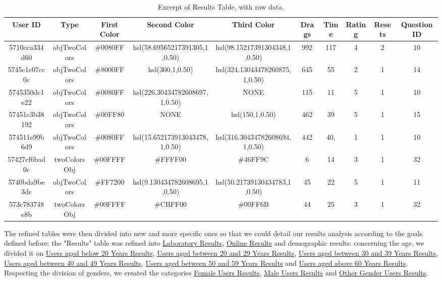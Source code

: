 \begin{table}[htbp]
  \resizebox{\textwidth}{!} {
  \begin{tabular} {|c|c|c|c|c|c|c|c|c|c|}
    \hline
    User ID & Type & First Color & Second Color & Third Color & Drags & Time & Rating & Resets & Question ID \\ \hline
    5710cca334d60 & objTwoColors & \#0080FF & hsl(58.69565217391305,1,0.50) & hsl(98.15217391304348,1,0.50) & 992 & 117 & 4 & 2 & 10 \\ \hline
    5745c1c07cc0c & objTwoColors & \#8000FF & hsl(300,1,0.50) & hsl(324.13043478260875,1,0.50) & 645 & 55 & 2 & 1 & 14 \\ \hline
    5745350dc1e22 & objTwoColors & \#0080FF & hsl(226.30434782608697,1,0.50) & NONE & 115 & 11 & 5 & 1 & 10 \\ \hline
    57451c3b38192 & objTwoColors & \#00FF80 & NONE & hsl(150,1,0.50) & 462 & 39 & 5 & 1 & 15 \\ \hline
    574511e99b6d9 & objTwoColors & \#0080FF & hsl(15.652173913043478,1,0.50) & hsl(316.30434782608694,1,0.50) & 442 & 40, & 1 & 1 & 10 \\ \hline
    57427cf6bad0c & twoColorsObj & \#00FFFF & \#FFFF00 & \#46FF9C & 6 & 14 & 3 & 1 & 32 \\ \hline
    5740bda9be3dc & objTwoColors & \#FF7200 & hsl(9.130434782608695,1,0.50) & hsl(50.21739130434783,1,0.50) & 45 & 22 & 5 & 1 & 11 \\ \hline
    573c783748e8b & twoColorsObj & \#00FFFF & \#CBFF00 & \#00FF6B & 44 & 25 & 3 & 1 & 32 \\ \hline
    \hline
  \end{tabular}}
  \caption[Excerpt of Raw "Results" Table]{Excerpt of Results Table, with raw data.}
  \label{table:csv_resultsraw}
\end{table} \par
%
The refined tables were then divided into new and more specific ones so that we could detail our results analysis according to the goals defined before;
the "Results" table was refined into \ul{Laboratory Results}, \ul{Online Results} and demographic results: concerning the age, we divided it
on \ul{Users aged below 20 Years Results}, \ul{Users aged between 20 and 29 Years Results}, \ul{Users aged between 30 and 39 Years Results},
\ul{Users aged between 40 and 49 Years Results}, \ul{Users aged between 50 and 59 Years Results} and \ul{Users aged above 60 Years Results}.
Respecting the division of genders, we created the categories \ul{Female Users Results}, \ul{Male Users Results} and \ul{Other Gender Users Results}.
